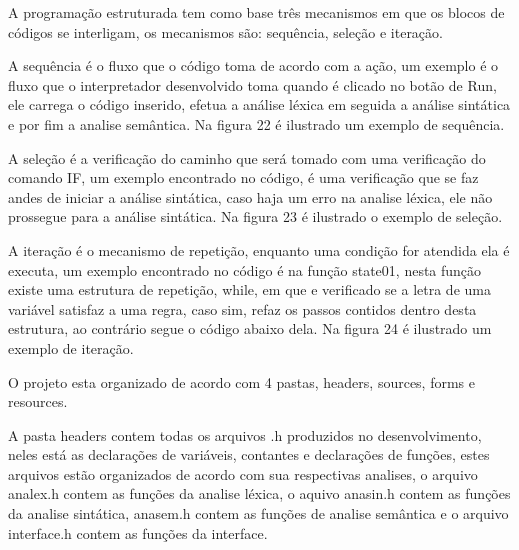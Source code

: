 \documentclass[12pt,oneside,a4paper,chapter=TITLE,section=TITLE,sumario=tradicional]{abntex2}
\begin{document}
A programação estruturada tem como base três mecanismos em que os blocos de códigos se interligam, os mecanismos são: sequência, seleção e iteração\cite{ivan2003}.

A sequência é o fluxo que o código toma de acordo com a ação\cite{ivan2003}, um exemplo é o fluxo que o interpretador desenvolvido toma quando é clicado no botão de Run, ele carrega o código inserido, efetua a análise léxica em seguida a análise sintática e por fim a analise semântica. Na figura 22 é ilustrado um exemplo de sequência.

\begin{figure}[htb]
\end{figure}

A seleção é a verificação do caminho que será tomado com uma verificação do comando IF\cite{ivan2003}, um exemplo encontrado no código, é uma verificação que se faz andes de iniciar a análise sintática, caso haja um erro na analise léxica, ele não prossegue para a análise sintática. Na figura 23 é ilustrado o exemplo de seleção.

\begin{figure}[htb]
\end{figure}

A iteração é o mecanismo de repetição, enquanto uma condição for atendida ela é executa\cite{ivan2003}, um exemplo encontrado no código é na função state01, nesta função existe uma estrutura de repetição, while, em que e verificado se a letra de uma variável satisfaz a uma regra, caso sim, refaz os passos contidos dentro desta estrutura, ao contrário segue o código abaixo dela. Na figura 24 é ilustrado um exemplo de iteração.

\begin{figure}[htb]
\end{figure}

O projeto esta organizado de acordo com 4 pastas, headers, sources, forms e resources.

A pasta headers contem todas os arquivos .h produzidos no desenvolvimento, neles está as declarações de variáveis, contantes e declarações de funções, estes arquivos estão organizados de acordo com sua respectivas analises, o arquivo analex.h contem as funções da analise léxica, o aquivo anasin.h contem as funções da analise sintática, anasem.h contem as funções de analise semântica e o arquivo interface.h contem as funções da interface.
\end{document}
